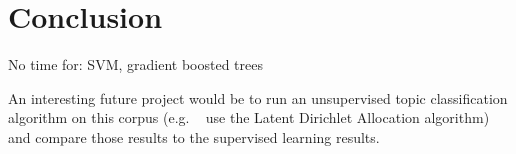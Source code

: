 \documentclass[11pt,a4paper,table]{article}
\begin{document}
\section{Conclusion}
\label{sec:conc}

No time for: SVM, gradient boosted trees

An interesting future project would be to run an unsupervised topic classification algorithm on this corpus (e.g. \citeauthor{Martin:15}~ use the Latent Dirichlet Allocation algorithm) and compare those results to the supervised learning results.

\end{document}
